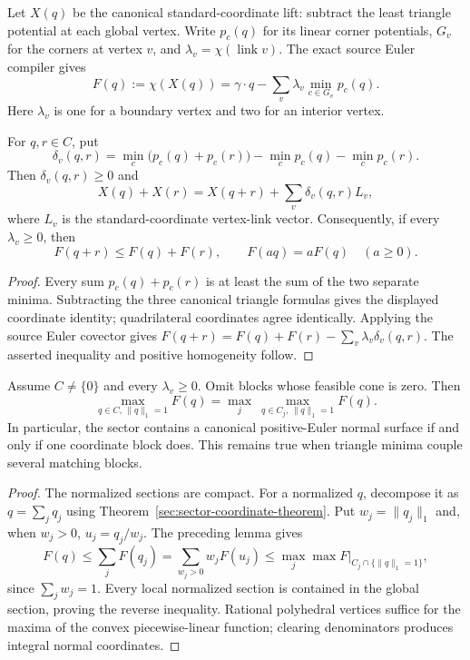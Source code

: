 Let $X(q)$ be the canonical standard-coordinate lift: subtract the least
triangle potential at each global vertex.  Write $p_c(q)$ for its linear
corner potentials, $G_v$ for the corners at vertex $v$, and
$\lambda_v=\chi(\operatorname{link}v)$.  The exact source Euler compiler gives
\begin{equation}
\label{sec:sector-euler-formula}
 F(q):=\chi(X(q))=\gamma\cdot q
                  -\sum_v\lambda_v\min_{c\in G_v}p_c(q).
\end{equation}
Here $\lambda_v$ is one for a boundary vertex and two for an interior vertex.

\begin{lemma}
\label{sec:sector-defect}
For $q,r\in C$, put
\[
 \delta_v(q,r)=\min_c\bigl(p_c(q)+p_c(r)\bigr)
                     -\min_c p_c(q)-\min_c p_c(r).
\]
Then $\delta_v(q,r)\geq0$ and
\[
 X(q)+X(r)=X(q+r)+\sum_v\delta_v(q,r)L_v,
\]
where $L_v$ is the standard-coordinate vertex-link vector.  Consequently,
if every $\lambda_v\geq0$, then
\[
 F(q+r)\leq F(q)+F(r),\qquad F(aq)=aF(q)\quad(a\geq0).
\]
\end{lemma}
\begin{proof}
Every sum $p_c(q)+p_c(r)$ is at least the sum of the two separate minima.
Subtracting the three canonical triangle formulas gives the displayed
coordinate identity; quadrilateral coordinates agree identically.
Applying the source Euler covector gives
$F(q+r)=F(q)+F(r)-\sum_v\lambda_v\delta_v(q,r)$.
The asserted inequality and positive homogeneity follow.
\end{proof}

\begin{theorem}
\label{sec:sector-euler-maximum}
Assume $C\ne\{0\}$ and every $\lambda_v\geq0$.  Omit blocks whose feasible
cone is zero.  Then
\[
 \max_{q\in C,\,\|q\|_1=1}F(q)
 =\max_j\ \max_{q\in C_j,\,\|q\|_1=1}F(q).
\]
In particular, the sector contains a canonical positive-Euler normal surface
if and only if one coordinate block does.  This remains true when triangle
minima couple several matching blocks.
\end{theorem}
\begin{proof}
The normalized sections are compact.  For a normalized $q$, decompose it
as $q=\sum_jq_j$ using Theorem~\ref{sec:sector-coordinate-theorem}.  Put
$w_j=\|q_j\|_1$ and, when $w_j>0$, $u_j=q_j/w_j$.
The preceding lemma gives
\[
 F(q)\leq\sum_jF(q_j)=\sum_{w_j>0}w_jF(u_j)
                         \leq\max_j\max F|_{C_j\cap\{\|q\|_1=1\}},
\]
since $\sum_jw_j=1$.  Every local normalized section is contained in the
global section, proving the reverse inequality.  Rational polyhedral
vertices suffice for the maxima of the convex piecewise-linear function;
clearing denominators produces integral normal coordinates.
\end{proof}

